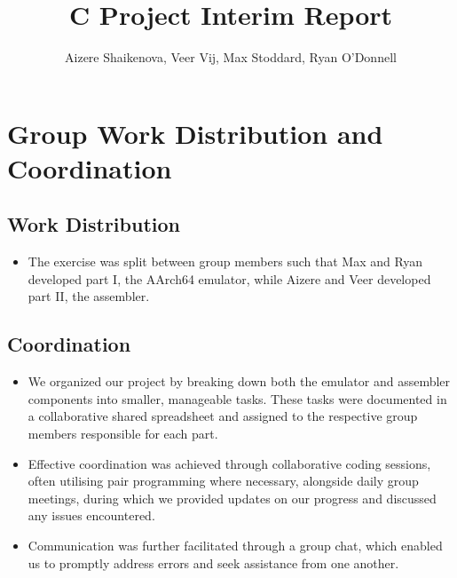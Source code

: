 \documentclass{article}
\title{C Project Interim Report}
\author{Aizere Shaikenova, Veer Vij, Max Stoddard, Ryan O'Donnell}
\begin{document}
\small
\maketitle



\section{Group Work Distribution and Coordination}
\label{sec:work_distribution}
\subsection{Work Distribution}
\begin{itemize}
    \item The exercise was split between group members such that Max and Ryan developed part I, the AArch64 emulator, while Aizere and Veer developed part II, the assembler.
\end{itemize}

\subsection{Coordination}
\begin{itemize}
    \item We organized our project by breaking down both the emulator and assembler components into smaller, manageable tasks. These tasks were documented in a collaborative shared spreadsheet and assigned to the respective group members responsible for each part.
    \item Effective coordination was achieved through collaborative coding sessions, often utilising pair programming where necessary, alongside daily group meetings, during which we provided updates on our progress and discussed any issues encountered.
    \item Communication was further facilitated through a group chat, which enabled us to promptly address errors and seek assistance from one another.
\end{itemize}
\end{document}
